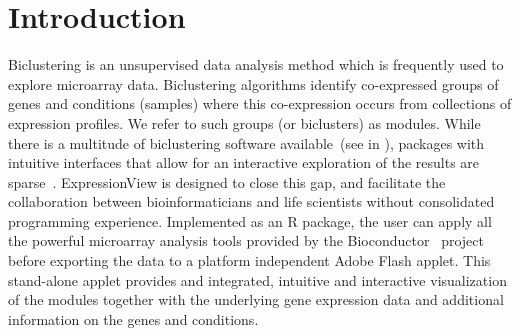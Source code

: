 \documentclass[round]{bioinfo}
\begin{document}
\vspace*{-10pt}
\section{Introduction}
Biclustering is an unsupervised data analysis method which is
frequently used to explore microarray data. Biclustering algorithms
identify co-expressed groups of
genes and conditions (samples) where this co-expression occurs from
collections of expression profiles. We refer to such groups (or
biclusters) as modules. While
there is a multitude of biclustering software available~(see in
\cite{madeira04,ihmels04}), packages with intuitive interfaces that
allow for an interactive exploration of the results are
sparse~\citep{santamaria08}. ExpressionView is designed to close this
gap, and facilitate the collaboration between bioinformaticians and
life scientists without consolidated programming
experience. Implemented as an R package, the user can apply all the
powerful microarray analysis tools provided by the
Bioconductor~\citep{gentleman04} project before exporting the data to
a platform independent Adobe Flash applet. This stand-alone applet
provides and integrated, intuitive and interactive visualization of
the modules together with the underlying gene expression data and
additional information on the genes and conditions.
\end{document}
